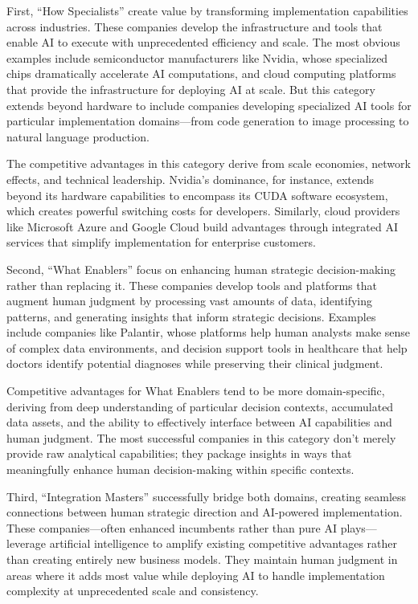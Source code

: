 \documentclass[
  Letterpaper,
]{scrbook}
\begin{document}
First, ``How Specialists'' create value by transforming implementation
capabilities across industries. These companies develop the
infrastructure and tools that enable AI to execute with unprecedented
efficiency and scale. The most obvious examples include semiconductor
manufacturers like Nvidia, whose specialized chips dramatically
accelerate AI computations, and cloud computing platforms that provide
the infrastructure for deploying AI at scale. But this category extends
beyond hardware to include companies developing specialized AI tools for
particular implementation domains---from code generation to image
processing to natural language production.

The competitive advantages in this category derive from scale economies,
network effects, and technical leadership. Nvidia's dominance, for
instance, extends beyond its hardware capabilities to encompass its CUDA
software ecosystem, which creates powerful switching costs for
developers. Similarly, cloud providers like Microsoft Azure and Google
Cloud build advantages through integrated AI services that simplify
implementation for enterprise customers.

Second, ``What Enablers'' focus on enhancing human strategic
decision-making rather than replacing it. These companies develop tools
and platforms that augment human judgment by processing vast amounts of
data, identifying patterns, and generating insights that inform
strategic decisions. Examples include companies like Palantir, whose
platforms help human analysts make sense of complex data environments,
and decision support tools in healthcare that help doctors identify
potential diagnoses while preserving their clinical judgment.

Competitive advantages for What Enablers tend to be more
domain-specific, deriving from deep understanding of particular decision
contexts, accumulated data assets, and the ability to effectively
interface between AI capabilities and human judgment. The most
successful companies in this category don't merely provide raw
analytical capabilities; they package insights in ways that meaningfully
enhance human decision-making within specific contexts.

Third, ``Integration Masters'' successfully bridge both domains,
creating seamless connections between human strategic direction and
AI-powered implementation. These companies---often enhanced incumbents
rather than pure AI plays---leverage artificial intelligence to amplify
existing competitive advantages rather than creating entirely new
business models. They maintain human judgment in areas where it adds
most value while deploying AI to handle implementation complexity at
unprecedented scale and consistency.
\end{document}
